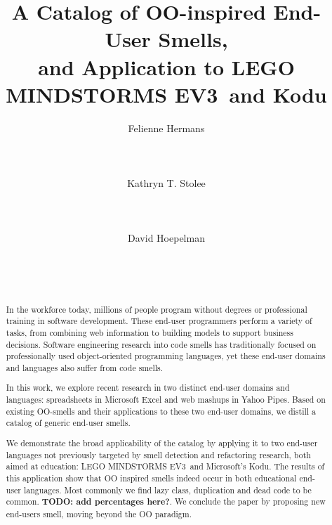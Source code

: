 \documentclass{sig-alternate}
\newcommand{\todo}[1]{\textbf{TODO: #1}}
\newcommand{\ms}{LEGO MINDSTORMS EV3}
\begin{document}
%
\title{A Catalog of OO-inspired End-User Smells, \\and Application to \ms~and Kodu}

\author{
\alignauthor
Felienne Hermans\\
       \\
       \\
       \\
\alignauthor
Kathryn T. Stolee\\
       \\
       \\
       \\
\alignauthor
David Hoepelman\\
       \\
       \\
       \\
}

\maketitle


\begin{abstract}
In the workforce today, millions of people program without degrees or professional training in software development. 
These end-user programmers perform a variety of tasks, from combining web information to building models to support business decisions. Software engineering research into code smells has traditionally focused on professionally used object-oriented programming languages, yet these end-user domains and languages also suffer from code smells. 

In this work, we explore recent research in two distinct end-user domains and languages: spreadsheets in Microsoft Excel and web mashups in Yahoo Pipes. Based on existing OO-smells and their applications to these two end-user domains, we distill a catalog of generic end-user smells. 

We demonstrate the broad applicability of the catalog by applying it to two end-user languages not previously targeted by smell detection and refactoring research, both aimed at education: \ms~and Microsoft's Kodu. The results of this application show that  OO inspired smells indeed occur in both educational end-user languages. Most commonly we find lazy class, duplication and dead code to be common. \todo{add percentages here?}. We conclude the paper by proposing new end-users smell, moving beyond the OO paradigm. 
\end{abstract}
\end{document}
